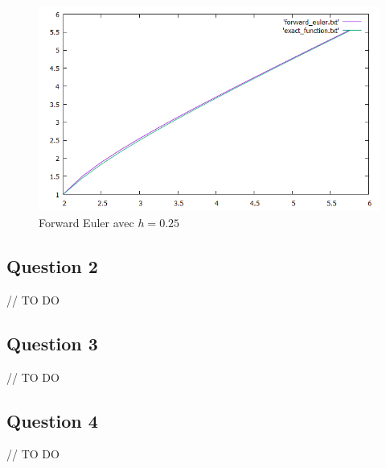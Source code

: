 \begin{figure}[H]
	\caption{\label{12_forward_1} Forward Euler avec $h=0.25$}
	\centering
	\includegraphics[scale = 0.6]{12_forward_1.png}
\end{figure}


\subsection{Question 2}

// TO DO

\subsection{Question 3}

// TO DO

\subsection{Question 4}

// TO DO